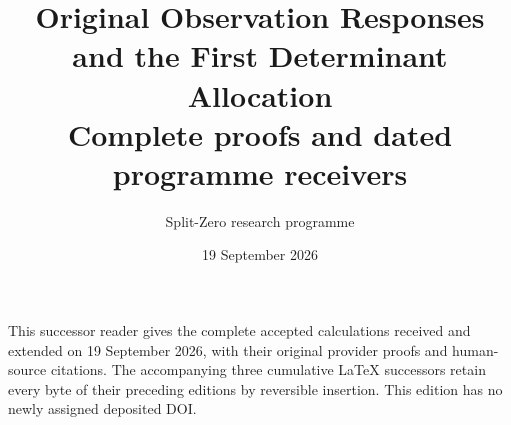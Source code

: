 \documentclass[11pt,a4paper]{article}
\title{Original Observation Responses and the First Determinant Allocation\\[0.6em]\large Complete proofs and dated programme receivers}
\author{Split-Zero research programme}
\date{19 September 2026}
\begin{document}
\maketitle
\noindent This successor reader gives the complete accepted calculations received and
extended on 19 September 2026, with their original provider proofs and
human-source citations. The accompanying three cumulative LaTeX successors
retain every byte of their preceding editions by reversible insertion.
This edition has no newly assigned deposited DOI.
\tableofcontents
\end{document}
